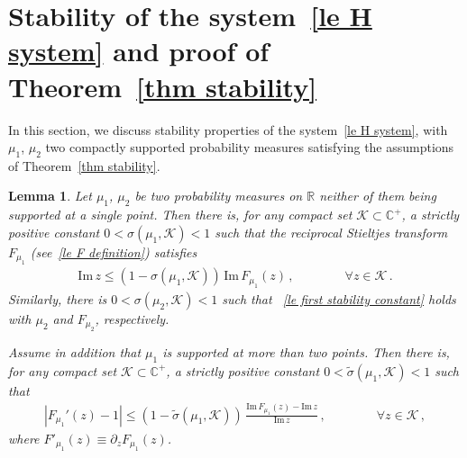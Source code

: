\documentclass[10pt,reqno]{amsart}
\numberwithin{equation}{section}
\theoremstyle{plain}
\newtheorem{lemma}[theorem]{Lemma}
\numberwithin{kevin}{section}
\theoremstyle{remark}
\newcommand{\im}{\mathrm{Im}\,}
\newcommand{\R}{{\mathbb R }}
\newcommand{\C}{{\mathbb C}}
\begin{document}
\section{Stability of the system~\eqref{le H system} and proof of Theorem~\ref{thm stability}}\label{s. stability}
In this section, we discuss stability properties of the system~\eqref{le H system}, with $\mu_1$, $\mu_2$ two compactly supported probability measures satisfying the assumptions of Theorem~\ref{thm stability}. 

\begin{lemma}\label{le lemma stability constants}
Let $\mu_1$, $\mu_2$ be two probability measures on $\R$ neither of them being supported at a single point. Then there is, for any compact set $\mathcal{K}\subset\C^+$, a strictly positive constant $0<\sigma(\mu_1,\mathcal{K})<1$ such that the reciprocal Stieltjes transform~$F_{\mu_1}$ (see~\eqref{le F definition}) satisfies
\begin{align}\label{le first stability constant}
\im z\le (1-\sigma(\mu_1,\mathcal{K}))\,\im F_{\mu_1}(z)\,,\qquad\qquad \forall z\in\mathcal{K}\,.
\end{align}
 Similarly, there is $0<\sigma(\mu_2,\mathcal{K})<1$ such that ~\eqref{le first stability constant} holds with $\mu_2$ and $F_{\mu_2}$, respectively. 

 Assume in addition that $\mu_1$ is supported at more than two points. Then there is, for any compact set $\mathcal{K}\subset\C^+$, a strictly positive constant $0<\widetilde\sigma(\mu_1,\mathcal{K})<1$ such that
\begin{align}\label{le second stability constant}
|F_{\mu_1}'(z)-1|\le(1- \widetilde\sigma(\mu_1,\mathcal{K}))\,\frac{\im F_{\mu_1}(z)-\im z}{\im z}\,,\qquad\qquad \forall z\in\mathcal{K}\,,
\end{align}
where $F'_{\mu_1}(z)\equiv\partial_z F_{\mu_1}(z)$.
\end{lemma}
\end{document}
